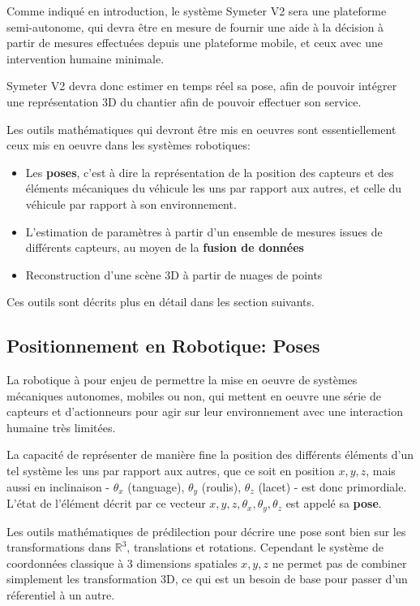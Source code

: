 \documentclass[12pt,a4paper]{report}
\begin{document}
	\para Comme indiqué en introduction, le système Symeter V2 sera une plateforme semi-autonome, qui devra être en mesure de fournir une aide à la décision à partir de mesures effectuées depuis une plateforme mobile, et ceux avec une intervention humaine minimale.
	
	\para Symeter V2 devra donc estimer en temps réel sa pose, afin de pouvoir intégrer une représentation 3D du chantier afin de pouvoir effectuer son service.
	
	\para Les outils mathématiques qui devront être mis en oeuvres sont essentiellement ceux mis en oeuvre dans les systèmes robotiques:
	 \begin{itemize}
	 	\item Les \textbf{poses}, c'est à dire la représentation de la position des capteurs et des éléments mécaniques du véhicule les uns par rapport aux autres, et celle du véhicule par rapport à son environnement.
	 	\item L'estimation de paramètres à partir d'un ensemble de mesures issues de différents capteurs, au moyen de la \textbf{fusion de données}
	 	\item Reconstruction d'une scène 3D à partir de nuages de points
	 \end{itemize} 
 
   \para Ces outils sont décrits plus en détail dans les section suivants.
	
	
		\subsection{Positionnement en Robotique: Poses}
		
		La robotique à pour enjeu de permettre la mise en oeuvre de systèmes mécaniques autonomes, mobiles ou non, qui mettent en oeuvre une série de capteurs et d'actionneurs pour agir sur leur environnement avec une interaction humaine très limitées.
		
		\para La capacité de représenter de manière fine la position des différents éléments d'un tel système les uns par rapport aux autres, que ce soit en position $x,y,z$, mais aussi en inclinaison - $\theta_x$ (tanguage), $\theta_y$ (roulis), $\theta_z$ (lacet) - est donc primordiale. L'état de l'élément décrit par ce vecteur $x,y,z, \theta_x, \theta_y, \theta_z$ est appelé sa \textbf{pose}.
		
				
		\para Les outils mathématiques de prédilection pour décrire une pose sont bien sur les transformations dans $\mathbb{R}^3$, translations et rotations. Cependant le système de coordonnées classique à 3 dimensions spatiales $x,y,z$ ne permet pas de combiner simplement les transformation 3D, ce qui est un besoin de base pour passer d'un réferentiel à un autre.
		
\end{document}
